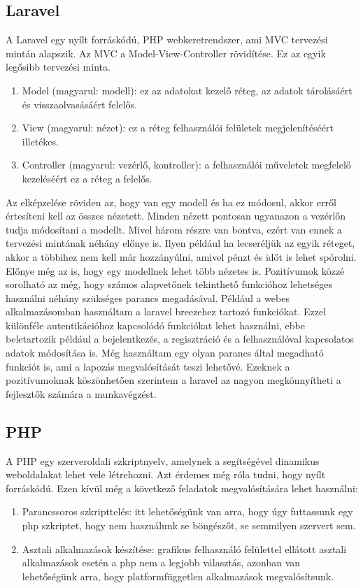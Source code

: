 \documentclass[]{thesis-ekf}
\theoremstyle{definition}
\theoremstyle{remark}
\begin{document}
	\subsection{Laravel}\label{sc-laravel}
		A Laravel egy nyílt forráskódú, PHP webkeretrendszer, ami MVC tervezési mintán alapszik. Az MVC a Model-View-Controller rövidítése. Ez az egyik legősibb tervezési minta.
		\begin{enumerate}
			\item Model (magyarul: modell): ez az adatokat kezelő réteg, az adatok tárolásáért és visszaolvasásáért felelős.
			\item View (magyarul: nézet): ez a réteg felhasználói felületek megjelenítéséért illetékes. 
			\item Controller (magyarul: vezérlő, kontroller): a felhasználói műveletek megfelelő kezeléséért ez a réteg a felelős.
		\end{enumerate}
		Az elképzelése röviden az, hogy van egy modell és ha ez módosul, akkor erről értesíteni kell az összes nézetett. Minden nézett pontosan ugyanazon a vezérlőn tudja módosítani a modellt. Mivel három részre van bontva, ezért van ennek a tervezési mintának néhány előnye is. Ilyen például ha lecseréljük az egyik réteget, akkor a többihez nem kell már hozzányúlni, amivel pénzt és időt is lehet spórolni. Előnye még az is, hogy egy modellnek lehet több nézetes is. Pozitívumok közzé sorolható az még, hogy számos alapvetőnek tekinthető funkcióhoz lehetséges használni néhány szükséges parancs megadásával. Például a webes alkalmazásomban használtam a laravel breezehez tartozó funkciókat. Ezzel különféle autentikációhoz kapcsolódó funkciókat lehet használni, ebbe beletartozik például a bejelentkezés, a regisztráció és a felhasználóval kapcsolatos adatok módosítása is. Még használtam egy olyan parancs által megadható funkciót is, ami a lapozás megvalósítását teszi lehetővé. Ezeknek a pozitívumoknak köszönhetően szerintem a laravel az nagyon megkönnyítheti a fejlesztők számára a munkavégzést. 
		\cite{Kusper, Laravel}
	\subsection{PHP}
		A PHP egy szerveroldali szkriptnyelv, amelynek a segítségével dinamikus weboldalakat lehet vele létrehozni. Azt érdemes még róla tudni, hogy nyílt forráskódú. Ezen kívül még a következő feladatok megvalósítására lehet használni:
		\begin{enumerate}
			\item Parancssoros szkripttelés: itt lehetőségünk van arra, hogy úgy futtassunk egy php szkriptet, hogy nem használunk se böngészőt, se semmilyen szervert sem.
			\item Asztali alkalmazások készítése: grafikus felhasználó felülettel ellátott asztali alkalmazások esetén a php nem a legjobb választás, azonban van lehetőségünk arra, hogy platformfüggetlen alkalmazások megvalósítsunk.
		\end{enumerate}
		\cite{PHP}
\end{document}
